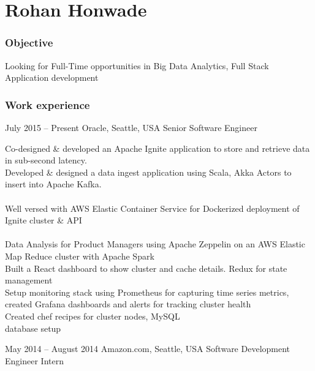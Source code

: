 \documentclass{tccv}
\begin{document}
\part{Rohan Honwade}

\section{Objective}
Looking for Full-Time opportunities in Big Data Analytics, Full Stack Application development

\section{Work experience}
\begin{eventlist}
\item{July 2015 -- Present}
     {Oracle, Seattle, USA}
     {Senior Software Engineer}
     
Co-designed \& developed an Apache Ignite application to store and retrieve data in sub-second latency.\\

Developed \& designed a data ingest application using Scala, Akka Actors to insert into Apache Kafka.\\
\\

Well versed with AWS Elastic Container Service for Dockerized deployment of Ignite cluster \& API\\
\\

Data Analysis for Product Managers using Apache Zeppelin on an AWS Elastic Map Reduce cluster with Apache Spark\\

Built a React dashboard to show cluster and cache details. Redux for state management\\

Setup monitoring stack using Prometheus for capturing time series metrics, created Grafana dashboards and alerts for tracking cluster health\\

Created chef recipes for cluster nodes, MySQL\\ database setup

\item{May 2014 -- August 2014}
     {Amazon.com, Seattle, USA}
     {Software Development Engineer Intern}


\end{eventlist}
\end{document}
